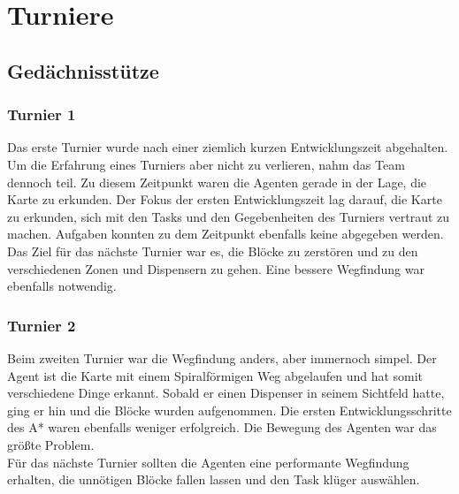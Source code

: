 \section{Turniere}

\subsection{Gedächnisstütze}
\subsubsection{Turnier 1}
Das erste Turnier wurde nach einer ziemlich kurzen Entwicklungszeit abgehalten. Um die Erfahrung eines Turniers aber nicht zu verlieren, nahm das Team dennoch teil. Zu diesem Zeitpunkt waren die Agenten gerade in der Lage, die Karte zu erkunden. Der Fokus der ersten Entwicklungszeit lag darauf, die Karte zu erkunden, sich mit den Tasks und den Gegebenheiten des Turniers vertraut zu machen. Aufgaben konnten zu dem Zeitpunkt ebenfalls keine abgegeben werden.\\
Das Ziel für das nächste Turnier war es, die Blöcke zu zerstören und zu den verschiedenen Zonen und Dispensern zu gehen. Eine bessere Wegfindung war ebenfalls notwendig.

%

\subsubsection{Turnier 2}
Beim zweiten Turnier war die Wegfindung anders, aber immernoch simpel. Der Agent ist die Karte mit einem Spiralförmigen Weg abgelaufen und hat somit verschiedene Dinge erkannt. Sobald er einen Dispenser in seinem Sichtfeld hatte, ging er hin und die Blöcke wurden aufgenommen. Die ersten Entwicklungsschritte des A* waren ebenfalls weniger erfolgreich. Die Bewegung des Agenten war das größte Problem. \\
Für das nächste Turnier sollten die Agenten eine performante Wegfindung erhalten, die unnötigen Blöcke fallen lassen und den Task klüger auswählen.

